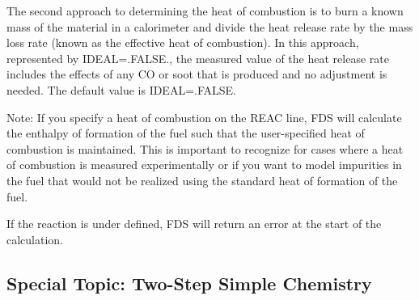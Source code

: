 \documentclass[11pt]{book}
\begin{document}
The second approach to determining the heat of combustion is to burn a known mass of the material in a calorimeter and divide the heat release
rate by the mass loss rate (known as the effective heat of combustion).  In this approach, represented by {\ct IDEAL=.FALSE.},
the measured value of the heat release rate includes the effects of any CO or soot that is produced and no adjustment is needed.  The default value is {\ct IDEAL=.FALSE.}

Note: If you specify a heat of combustion on the {\ct REAC} line, FDS will calculate the enthalpy of formation of the fuel such that the user-specified heat of combustion is maintained. This is important to recognize for cases where a heat of combustion is measured experimentally or if you want to model impurities in the fuel that would not be realized using the standard heat of formation of the fuel.

If the reaction is under defined, FDS will return an error at the start of the calculation.


\subsection{Special Topic: Two-Step Simple Chemistry}
\label{info:two-step_simple_chemistry}
\label{propane_flame_2reac}
\end{document}
